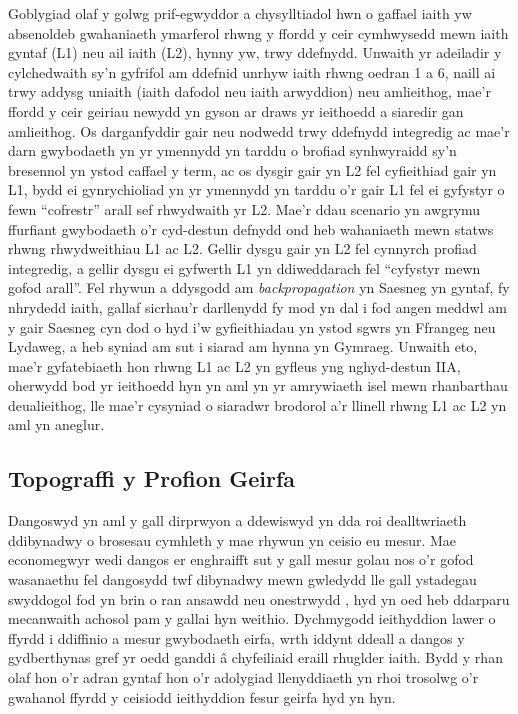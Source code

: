 Goblygiad olaf y golwg prif-egwyddor a chysylltiadol hwn o gaffael iaith yw absenoldeb gwahaniaeth ymarferol rhwng y ffordd y ceir cymhwysedd mewn iaith gyntaf (L1) neu ail iaith (L2), hynny yw, trwy ddefnydd. Unwaith yr adeiladir y cylchedwaith sy'n gyfrifol am ddefnid unrhyw iaith rhwng oedran 1 a 6, naill ai trwy addysg uniaith (iaith dafodol neu iaith arwyddion) neu amlieithog, mae'r ffordd y ceir geiriau newydd yn gyson ar draws yr ieithoedd a siaredir gan amlieithog. Os darganfyddir gair neu nodwedd trwy ddefnydd integredig ac mae'r darn gwybodaeth yn yr ymennydd yn tarddu o brofiad synhwyraidd sy'n bresennol yn ystod caffael y term, ac os dysgir gair yn L2 fel cyfieithiad gair yn L1, bydd ei gynrychioliad yn yr ymennydd yn tarddu o'r gair L1 fel ei gyfystyr o fewn ``cofrestr'' arall sef rhwydwaith yr L2. Mae'r ddau scenario yn awgrymu ffurfiant gwybodaeth o'r cyd-destun defnydd ond heb wahaniaeth mewn statws rhwng rhwydweithiau L1 ac L2. Gellir dysgu gair yn L2 fel cynnyrch profiad integredig, a gellir dysgu ei gyfwerth L1 yn ddiweddarach fel ``cyfystyr mewn gofod arall''. Fel rhywun a ddysgodd am \textit{backpropagation} yn Saesneg yn gyntaf, fy nhrydedd iaith, gallaf sicrhau'r darllenydd fy mod yn dal i fod angen meddwl am y gair Saesneg cyn dod o hyd i'w gyfieithiadau yn ystod sgwrs yn Ffrangeg neu Lydaweg, a heb syniad am sut i siarad am hynna yn Gymraeg. Unwaith eto, mae'r gyfatebiaeth hon rhwng L1 ac L2 yn gyfleus yng nghyd-destun IIA, oherwydd bod yr ieithoedd hyn yn aml yn yr amrywiaeth isel mewn rhanbarthau deualieithog, lle mae'r cysyniad o siaradwr brodorol a'r llinell rhwng L1 ac L2 yn aml yn aneglur.

\subsection{Topograffi y Profion Geirfa}
Dangoswyd yn aml y gall dirprwyon a ddewiswyd yn dda roi dealltwriaeth ddibynadwy o brosesau cymhleth y mae rhywun yn ceisio eu mesur. Mae economegwyr wedi dangos er enghraifft sut y gall mesur golau nos o'r gofod wasanaethu fel dangosydd twf dibynadwy mewn gwledydd lle gall ystadegau swyddogol fod yn brin o ran ansawdd neu onestrwydd \parencite{henderson_measuring_2009}, hyd yn oed heb ddarparu mecanwaith achosol pam y gallai hyn weithio. Dychmygodd ieithyddion lawer o ffyrdd i ddiffinio a mesur gwybodaeth eirfa, wrth iddynt ddeall a dangos y gydberthynas gref yr oedd ganddi â chyfeiliaid eraill rhuglder iaith. Bydd y rhan olaf hon o'r adran gyntaf hon o'r adolygiad llenyddiaeth yn rhoi trosolwg o'r gwahanol ffyrdd y ceisiodd ieithyddion fesur geirfa hyd yn hyn.

